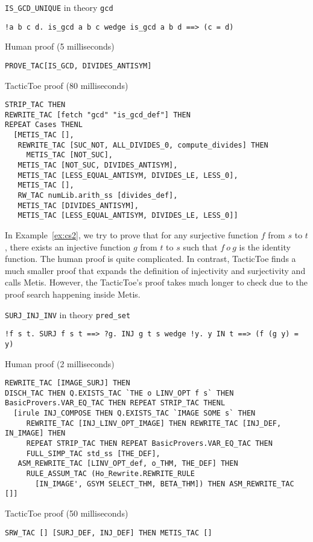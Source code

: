 \documentclass[runningheads,a4paper,draft]{svjour3}
\def\metis{\textsf{Metis}\xspace}
\def\tactictoe{\textsf{TacticToe}\xspace}
\begin{document}
\begin{example}\label{ex:cs1} \texttt{IS\_GCD\_UNIQUE} in theory \texttt{gcd}
\begin{lstlisting}[language=SMLSmall]
!a b c d. is_gcd a b c wedge is_gcd a b d ==> (c = d)
\end{lstlisting}
Human proof (5 milliseconds)
\begin{lstlisting}[language=SMLSmall]
PROVE_TAC[IS_GCD, DIVIDES_ANTISYM]
\end{lstlisting}
\tactictoe proof (80 milliseconds)
\begin{lstlisting}[language=SMLSmall]
STRIP_TAC THEN
REWRITE_TAC [fetch "gcd" "is_gcd_def"] THEN
REPEAT Cases THENL
  [METIS_TAC [],
   REWRITE_TAC [SUC_NOT, ALL_DIVIDES_0, compute_divides] THEN
     METIS_TAC [NOT_SUC],
   METIS_TAC [NOT_SUC, DIVIDES_ANTISYM],
   METIS_TAC [LESS_EQUAL_ANTISYM, DIVIDES_LE, LESS_0],
   METIS_TAC [],
   RW_TAC numLib.arith_ss [divides_def],
   METIS_TAC [DIVIDES_ANTISYM],
   METIS_TAC [LESS_EQUAL_ANTISYM, DIVIDES_LE, LESS_0]]
\end{lstlisting}
\end{example}

In Example~\ref{ex:cs2}, we try to prove that for any surjective function $f$
from $s$ to $t$, there exists an injective function $g$ from $t$ to $s$ such
that $f\ o\ g$ is the identity function. The human proof is quite complicated.
In contrast, \tactictoe finds a much smaller proof that expands the
definition of injectivity and surjectivity and calls \metis.
However, the \tactictoe's proof takes much longer to check due to the proof search happening inside \metis.

\begin{example}\label{ex:cs2} \texttt{SURJ\_INJ\_INV} in theory
\texttt{pred\_set}
\begin{lstlisting}[language=SMLSmall]
!f s t. SURJ f s t ==> ?g. INJ g t s wedge !y. y IN t ==> (f (g y) = y)
\end{lstlisting}
Human proof (2 milliseconds)
\begin{lstlisting}[language=SMLSmall]
REWRITE_TAC [IMAGE_SURJ] THEN
DISCH_TAC THEN Q.EXISTS_TAC `THE o LINV_OPT f s` THEN
BasicProvers.VAR_EQ_TAC THEN REPEAT STRIP_TAC THENL
  [irule INJ_COMPOSE THEN Q.EXISTS_TAC `IMAGE SOME s` THEN
     REWRITE_TAC [INJ_LINV_OPT_IMAGE] THEN REWRITE_TAC [INJ_DEF, IN_IMAGE] THEN
     REPEAT STRIP_TAC THEN REPEAT BasicProvers.VAR_EQ_TAC THEN
     FULL_SIMP_TAC std_ss [THE_DEF],
   ASM_REWRITE_TAC [LINV_OPT_def, o_THM, THE_DEF] THEN
     RULE_ASSUM_TAC (Ho_Rewrite.REWRITE_RULE
       [IN_IMAGE', GSYM SELECT_THM, BETA_THM]) THEN ASM_REWRITE_TAC []]
\end{lstlisting}
\tactictoe proof (50 milliseconds)
\begin{lstlisting}[language=SMLSmall]
SRW_TAC [] [SURJ_DEF, INJ_DEF] THEN METIS_TAC []
\end{lstlisting}
\end{example}
\end{document}
